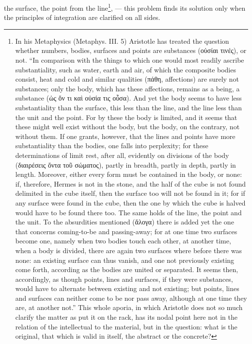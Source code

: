 \documentclass[12pt,a4paper,openany]{book}
\begin{document}
the surface, the point from the line\footnote[1]{In his Metaphysics (Metaphys. III. 5) Aristotle has treated the question whether numbers, bodies, surfaces and points are substances (οὐσίαι τινές), or not. ``In comparison with the things to which one would most readily ascribe substantiality, such as water, earth and air, of which the composite bodies consist, heat and cold and similar qualities (πάθη, affections) are surely not substances; only the body, which has these affections, remains as a being, a substance (ὡς ὄν τι καὶ οὐσία τις οὖσα). And yet the body seems to have less substantiality than the surface, this less than the line, and the line less than the unit and the point. For by these the body is limited, and it seems that these might well exist without the body, but the body, on the contrary, not without them. If one grants, however, that the lines and points have more substantiality than the bodies, one falls into perplexity; for these determinations of limit rest, after all, evidently on divisions of the body (διαιρέσεις ὄντα τοῦ σώματος), partly in breadth, partly in depth, partly in length. Moreover, either every form must be contained in the body, or none: if, therefore, Hermes is not in the stone, and the half of the cube is not found delimited in the cube itself, then the surface too will not be found in it; for if any surface were found in the cube, then the one by which the cube is halved would have to be found there too. The same holds of the line, the point and the unit. To the absurdities mentioned (ἄλογα) there is added yet the one that concerns coming-to-be and passing-away; for at one time two surfaces become one, namely when two bodies touch each other, at another time, when a body is divided, there are again two surfaces where before there was none: an existing surface can thus vanish, and one not previously existing come forth, according as the bodies are united or separated. It seems then, accordingly, as though points, lines and surfaces, if they were substances, would have to alternate between existing and not existing; but points, lines and surfaces can neither come to be nor pass away, although at one time they are, at another not.'' This whole aporia, in which Aristotle does not so much clarify the matter as put it on the rack, has its nodal point here not in the relation of the intellectual to the material, but in the question: what is the original, that which is valid in itself, the abstract or the concrete?}, --- this problem finds
its solution only when the principles of integration are clarified on all sides.
\end{document}
